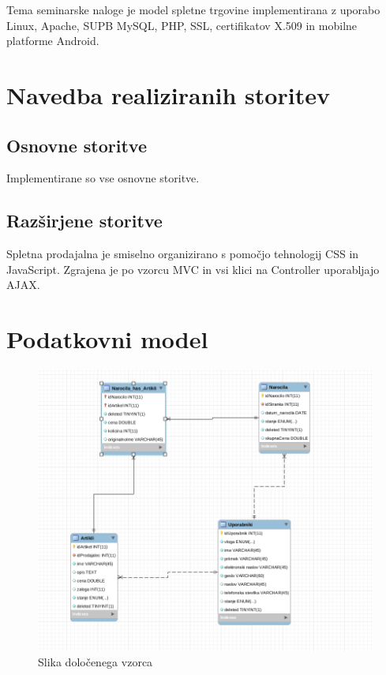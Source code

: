 \documentclass[a4paper,12pt]{report}
\begin{document}
Tema seminarske naloge je model spletne trgovine implementirana z uporabo Linux, Apache, SUPB MySQL, PHP, SSL, certifikatov X.509 in mobilne platforme Android.


\chapter{Navedba realiziranih storitev}

\section{Osnovne storitve}

Implementirane so vse osnovne storitve.

\section{Razširjene storitve}

Spletna prodajalna je smiselno organizirano s pomočjo tehnologij CSS in JavaScript. Zgrajena je po vzorcu MVC in vsi klici na Controller uporabljajo AJAX.


\chapter{Podatkovni model}

\begin{figure}[htb]
	\centering
	\includegraphics[width=13cm]{img/baza.png}
	\caption{Slika določenega vzorca}
\label{fig:1}
\end{figure}
\end{document}
